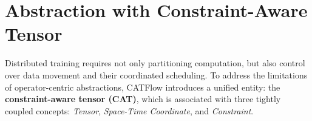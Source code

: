 \documentclass[letterpaper,twocolumn,10pt]{article}
\newcommand{\name}{CATFlow}
\begin{document}



\section{Abstraction with Constraint-Aware Tensor}
\label{sec:abstraction}

Distributed training requires not only partitioning computation, but also control over data movement and their coordinated scheduling. To address the limitations of operator-centric abstractions, \name{} introduces a unified entity: the \textbf{constraint-aware tensor (CAT)}, which is associated with three tightly coupled concepts: \textit{Tensor}, \textit{Space-Time Coordinate}, and \textit{Constraint}. 
\end{document}
